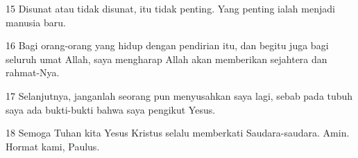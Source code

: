 \par 15 Disunat atau tidak disunat, itu tidak penting. Yang penting ialah menjadi manusia baru.
\par 16 Bagi orang-orang yang hidup dengan pendirian itu, dan begitu juga bagi seluruh umat Allah, saya mengharap Allah akan memberikan sejahtera dan rahmat-Nya.
\par 17 Selanjutnya, janganlah seorang pun menyusahkan saya lagi, sebab pada tubuh saya ada bukti-bukti bahwa saya pengikut Yesus.
\par 18 Semoga Tuhan kita Yesus Kristus selalu memberkati Saudara-saudara. Amin. Hormat kami, Paulus.


